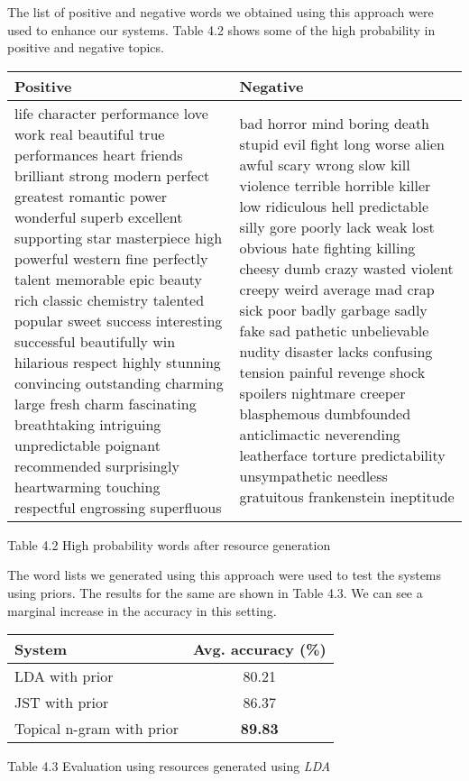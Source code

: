 The list of positive and negative words we obtained using this approach were used to enhance our systems. Table 
4.2 shows some of the high probability in positive and negative topics.

\begin{center}
\begin{tabular}{ |p{7cm}|p{7cm}| }
  \hline \hline
  Positive & Negative \\ \hline \hline
  life character performance love work real beautiful true performances heart friends brilliant strong modern perfect 
  greatest romantic power wonderful superb excellent supporting star masterpiece high powerful western fine perfectly 
  talent memorable epic beauty rich classic chemistry talented popular sweet success interesting successful beautifully 
  win hilarious respect highly stunning convincing outstanding charming large fresh charm fascinating breathtaking 
  intriguing unpredictable poignant recommended surprisingly heartwarming touching respectful engrossing superfluous & 
  bad horror mind boring death stupid evil fight long worse alien awful scary wrong slow kill violence terrible horrible 
  killer low ridiculous hell predictable silly gore poorly lack weak lost obvious hate fighting killing cheesy dumb 
  crazy wasted violent creepy weird average mad crap sick poor badly garbage sadly fake sad pathetic unbelievable nudity 
  disaster lacks confusing tension painful revenge shock spoilers nightmare creeper blasphemous dumbfounded anticlimactic
  neverending leatherface torture predictability unsympathetic needless gratuitous frankenstein ineptitude  \\ \hline
\end{tabular}
\end{center}
\begin{center}
 Table 4.2 High probability words after resource generation
\end{center}


The word lists we generated using this approach were used to test the systems using priors. The results for the same
are shown in Table 4.3. We can see a marginal increase in the accuracy in this setting.

\begin{center}
\begin{tabular}{|l|c|}
\hline \bf System & \bf Avg. accuracy (\%)\\ \hline
LDA with prior & 80.21\\
JST with prior & 86.37\\
Topical n-gram with prior & \textbf{89.83}\\
\hline
\end{tabular}
\end{center}
\begin{center}
 Table 4.3 Evaluation using resources generated using \textit{LDA}
\end{center}


